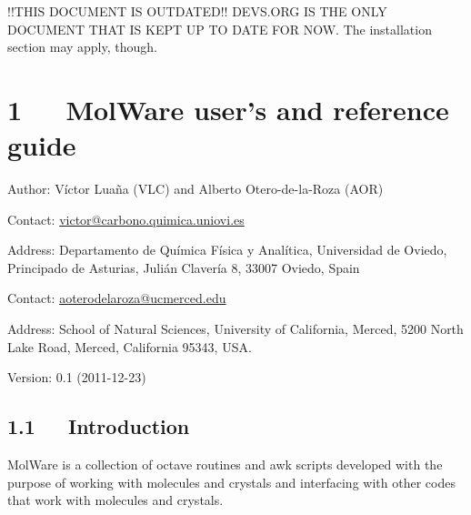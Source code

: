 \documentclass[a4paper]{article}
\newenvironment{DUfieldlist}%
    {\quote\description}
    {\enddescription\endquote}
\begin{document}
!!THIS DOCUMENT IS OUTDATED!!
DEVS.ORG IS THE ONLY DOCUMENT THAT IS KEPT UP TO DATE FOR NOW.
The installation section may apply, though.


\section{1~~~MolWare user's and reference guide%
  \label{molware-user-s-and-reference-guide}%
}
%
\begin{DUfieldlist}
\item[{Author:}]
Víctor Luaña (VLC) and Alberto Otero-de-la-Roza (AOR)

\item[{Contact:}]
\href{mailto:victor@carbono.quimica.uniovi.es}{victor@carbono.quimica.uniovi.es}

\item[{Address:}]
Departamento de Química Física y Analítica, Universidad de Oviedo,
Principado de Asturias,
Julián Clavería 8, 33007 Oviedo, Spain

\item[{Contact:}]
\href{mailto:aoterodelaroza@ucmerced.edu}{aoterodelaroza@ucmerced.edu}

\item[{Address:}]
School of Natural Sciences,
University of California, Merced, 5200 North Lake Road, Merced,
California 95343, USA.

\item[{Version:}]
0.1 (2011-12-23)

\end{DUfieldlist}

\thispagestyle{empty}
\enlargethispage{+1\baselineskip}

\noindent{}

\clearpage

\label{contents}
\tableofcontents


\clearpage


\subsection{1.1~~~Introduction%
  \label{introduction}%
}

MolWare is a collection of octave routines and awk scripts developed with
the purpose of working with molecules and crystals and interfacing with
other codes that work with molecules and crystals.
\end{document}
